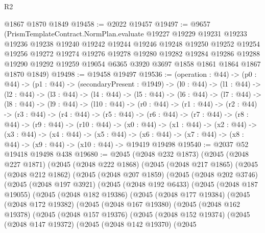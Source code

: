 \begin{lexlean}{R2}
\begin{coremodule}
    @1867
    @1870
    @1849
@19458 := @2022 @19457
@19497 := @9657
    (PrismTemplateContract.NormPlan.evaluate
      @19227
      @19229
      @19231
      @19233
      @19236
      @19238
      @19240
      @19242
      @19244
      @19246
      @19248
      @19250
      @19252
      @19254
      @19256
      @19272
      @19274
      @19276
      @19278
      @19280
      @19282
      @19284
      @19286
      @19288
      @19290
      @19292
      @19259
      @19054
      @6365
      @3920
      @3697
      @1858
      @1861
      @1864
      @1867
      @1870
      @1849)
@19498 := @19458 @19497
@19536 := (operation : @44) ->
  (p0 : @44) ->
  (p1 : @44) ->
  (secondaryPresent : @1949) ->
  (l0 : @44) ->
  (l1 : @44) ->
  (l2 : @44) ->
  (l3 : @44) ->
  (l4 : @44) ->
  (l5 : @44) ->
  (l6 : @44) ->
  (l7 : @44) ->
  (l8 : @44) ->
  (l9 : @44) ->
  (l10 : @44) ->
  (r0 : @44) ->
  (r1 : @44) ->
  (r2 : @44) ->
  (r3 : @44) ->
  (r4 : @44) ->
  (r5 : @44) ->
  (r6 : @44) ->
  (r7 : @44) ->
  (r8 : @44) ->
  (r9 : @44) ->
  (r10 : @44) ->
  (x0 : @44) ->
  (x1 : @44) ->
  (x2 : @44) ->
  (x3 : @44) ->
  (x4 : @44) ->
  (x5 : @44) -> (x6 : @44) -> (x7 : @44) -> (x8 : @44) -> (x9 : @44) -> (x10 : @44) -> @19419 @19498
@19540 := @2037 @52 @19418 @19498 @438
@19680 := @2045
    (@2048 @232 @1873)
    (@2045
      (@2048 @227 @1871)
      (@2045
        (@2048 @222 @1868)
        (@2045
          (@2048 @217 @1865)
          (@2045
            (@2048 @212 @1862)
            (@2045
              (@2048 @207 @1859)
              (@2045
                (@2048 @202 @3746)
                (@2045
                  (@2048 @197 @3921)
                  (@2045
                    (@2048 @192 @6433)
                    (@2045
                      (@2048 @187 @19055)
                      (@2045
                        (@2048 @182 @19386)
                        (@2045
                          (@2048 @177 @19384)
                          (@2045
                            (@2048 @172 @19382)
                            (@2045
                              (@2048 @167 @19380)
                              (@2045
                                (@2048 @162 @19378)
                                (@2045
                                  (@2048 @157 @19376)
                                  (@2045
                                    (@2048 @152 @19374)
                                    (@2045
                                      (@2048 @147 @19372)
                                      (@2045
                                        (@2048 @142 @19370)
                                        (@2045

\end{coremodule}
\end{lexlean}
